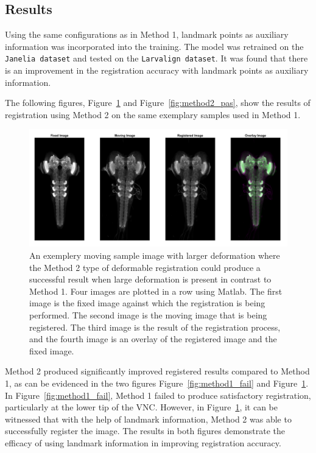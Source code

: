 \documentclass{report}
\begin{document}
	
	\subsection{Results}
	Using the same configurations as in Method 1, landmark points as auxiliary information was incorporated into the training. The model was retrained on the \texttt{Janelia dataset} and tested on the \texttt{Larvalign dataset}. It was found that there is an improvement in the registration accuracy with landmark points as auxiliary information.
	
	The following figures, Figure~\ref{fig:method2_fail} and Figure~\ref{fig:method2_pas}, show the results of registration using Method 2 on the same exemplary samples used in Method 1.
	
	\begin{figure}[h!]
		\centering
		\includegraphics[width=0.9\columnwidth]{resources/chapter4/method2/np_60H12_14E09_MB049B_020113B_scaled.tif.png}
		\caption{An exemplery moving sample image with larger deformation where the Method 2 type of deformable registration could produce a successful result when large deformation is present in contrast to Method 1. Four images are plotted in a row using Matlab. The first image is the fixed image against which the registration is being performed. The second image is the moving image that is being registered. The third image is the result of the registration process, and the fourth image is an overlay of the registered image and the fixed image.}
		\label{fig:method2_fail}
	\end{figure}
		
	Method 2 produced significantly improved registered results compared to Method 1, as can be evidenced in the two figures Figure~\ref{fig:method1_fail} and Figure~\ref{fig:method2_fail}. In Figure~\ref{fig:method1_fail}, Method 1 failed to produce satisfactory registration, particularly at the lower tip of the VNC. However, in Figure~\ref{fig:method2_fail}, it can be witnessed that with the help of landmark information, Method 2 was able to successfully register the image. The results in both figures demonstrate the efficacy of using landmark information in improving registration accuracy.
\end{document}
